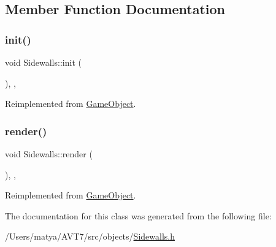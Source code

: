 \subsection{Member Function Documentation}
\mbox{\label{class_sidewalls_a4d6161bfb13fe2779a9510c424879707}} 
\subsubsection{\texorpdfstring{init()}{init()}}
{\footnotesize\ttfamily void Sidewalls\+::init (\begin{DoxyParamCaption}{ }\end{DoxyParamCaption})\hspace{0.3cm}{\ttfamily [inline]}, {\ttfamily [override]}, {\ttfamily [virtual]}}



Reimplemented from \hyperlink{class_game_object_aecb2c1b9f69715d854f7604d5d7978ec}{Game\+Object}.

\mbox{\label{class_sidewalls_a3459ee5dee7a73043955607c5cb51d73}} 
\subsubsection{\texorpdfstring{render()}{render()}}
{\footnotesize\ttfamily void Sidewalls\+::render (\begin{DoxyParamCaption}{ }\end{DoxyParamCaption})\hspace{0.3cm}{\ttfamily [inline]}, {\ttfamily [override]}, {\ttfamily [virtual]}}



Reimplemented from \hyperlink{class_game_object_a484efb66a7a27c101e84c11d9905d7a6}{Game\+Object}.



The documentation for this class was generated from the following file\+:\begin{DoxyCompactItemize}
\item 
/\+Users/matya/\+A\+V\+T7/src/objects/\hyperlink{_sidewalls_8h}{Sidewalls.\+h}\end{DoxyCompactItemize}
